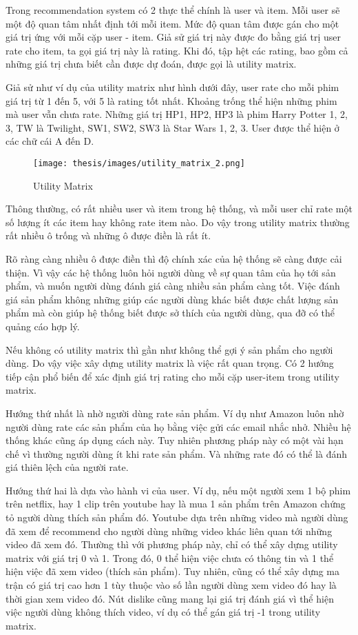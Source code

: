 Trong recommendation system có 2 thực thể chính là user và item. Mỗi user sẽ một độ quan tâm nhất định tới mỗi item. Mức độ quan tâm được gán cho một giá trị ứng với mỗi cặp user - item. Giả sử giá trị này được đo bằng giá trị user rate cho item, ta gọi giá trị này là rating. Khi đó, tập hệt các rating, bao gồm cả những giá trị chưa biết cần được dự đoán, được gọi là utility matrix.

Giả sử như ví dụ của utility matrix như hình dưới đây, user rate cho mỗi phim giá trị từ 1 đến 5, với 5 là rating tốt nhất. Khoảng trống thể hiện những phim mà user vẫn chưa rate. Những giá trị HP1, HP2, HP3 là phim Harry Potter 1, 2, 3, TW là Twilight, SW1, SW2, SW3 là Star Wars 1, 2, 3. User được thể hiện ở các chữ cái A đến D.

\begin{figure}[ht]
\texttt{[image: thesis/images/utility\_matrix\_2.png]}
\caption{Utility Matrix}
\end{figure}

Thông thường, có rất nhiều user và item trong hệ thống, và mỗi user chỉ rate một số lượng ít các item hay không rate item nào. Do vậy trong utility matrix thường rất nhiều ô trống và những ô được điền là rất ít.

Rõ ràng càng nhiều ô được điền thì độ chính xác của hệ thống sẽ càng được cải thiện. Vì vậy các hệ thống luôn hỏi người dùng về sự quan tâm của họ tới sản phẩm, và muốn người dùng đánh giá càng nhiều sản phẩm càng tốt. Việc đánh giá sản phẩm không những giúp các người dùng khác biết được chất lượng sản phẩm mà còn giúp hệ thống biết được sở thích của người dùng, qua đỡ có thể quảng cáo hợp lý.

Nếu không có utility matrix thì gần như không thể gợi ý sản phẩm cho người dùng. Do vậy việc xây dựng utility matrix là việc rất quan trọng. Có 2 hướng tiếp cận phổ biến để xác định giá trị rating cho mỗi cặp user-item trong utility matrix. 

Hướng thứ nhất là nhờ người dùng rate sản phẩm. Ví dụ như Amazon luôn nhờ người dùng rate các sản phẩm của họ bằng việc gửi các email nhắc nhở. Nhiều hệ thống khác cũng áp dụng cách này. Tuy nhiên phương pháp này có một vài hạn chế vì thường người dùng ít khi rate sản phẩm. Và những rate đó có thể là đánh giá thiên lệch của người rate.

Hướng thứ hai là dựa vào hành vi của user. Ví dụ, nếu một người xem 1 bộ phim trên netflix, hay 1 clip trên youtube hay là mua 1 sản phẩm trên Amazon chứng tỏ người dùng thích sản phẩm đó. Youtube dựa trên những video mà người dùng đã xem để recommend cho người dùng những video khác liên quan tới những video đã xem đó. Thường thì với phương pháp này, chỉ có thể xây dựng utility matrix với giá trị 0 và 1. Trong đó, 0 thể hiện việc chưa có thông tin và 1 thể hiện việc đã xem video (thích sản phẩm). Tuy nhiên, cũng có thể xây dựng ma trận có giá trị cao hơn 1 tùy thuộc vào số lần người dùng xem video đó hay là thời gian xem video đó. Nút dislike cũng mang lại giá trị đánh giá vì thể hiện việc người dùng không thích video, ví dụ có thể gán giá trị -1 trong utility matrix.